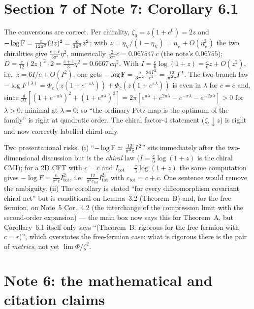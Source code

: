 \documentclass[11pt]{article}
\begin{document}
\section{Section 7 of Note 7: Corollary 6.1}\label{sec:cor}
\begin{verdictok}
The conversions are correct.  Per chirality, $\zeta_0=z(1+e^0)=2z$ and $-\log\operatorname{F}=\frac c{12\pi^2}(2z)^2=\frac c{3\pi^2}z^2$;
with $z=\eta_{\mathrm V}/(1-\eta_{\mathrm V})=\eta_{\mathrm V}+O(\eta_{\mathrm V}^2)$ the two chiralities give
$\frac{c+\bar c}{3\pi^2}\eta^2$, numerically $\frac2{3\pi^2}c=0.067547\,c$ (the note's $0.06755$);
$D=\frac c{12}(2z)^2\cdot2=\frac{c+\bar c}3\eta^2=0.6667\,c\eta^2$.  With $I=\frac c6\log(1+z)=\frac c6z+O(z^2)$,
i.e.\ $z=6I/c+O(I^2)$, one gets $-\log\operatorname{F}=\frac c{3\pi^2}\frac{36I^2}{c^2}=\frac{12}{\pi^2c}I^2$.  The
two-branch law $-\log F^{(\lambda)}=\Phi_c(z(1+e^{-\pi\lambda}))+\Phi_{\bar c}(z(1+e^{\pi\lambda}))$ is even in
$\lambda$ for $c=\bar c$ and, since $\frac d{d\lambda}[(1+e^{-\pi\lambda})^2+(1+e^{\pi\lambda})^2]
=2\pi[e^{\pi\lambda}+e^{2\pi\lambda}-e^{-\pi\lambda}-e^{-2\pi\lambda}]>0$ for $\lambda>0$, minimal at $\lambda=0$;
so ``the ordinary Petz map is the optimum of the family'' is right at quadratic order.  The chiral factor-$4$
statement ($\zeta_t\downarrow z$) is right and now correctly labelled chiral-only.
\end{verdictok}
\begin{verdictgap}
Two presentational risks.  (i) ``$-\log\operatorname{F}\simeq\frac{12}{\pi^2c}I^2$'' sits immediately after the
two-dimensional discussion but is the \emph{chiral} law ($I=\frac c6\log(1+z)$ is the chiral CMI); for a 2D CFT
with $c=\bar c$ and $I_{\mathrm{tot}}=\frac c3\log(1+z)$ the same computation gives
$-\log F=\frac6{\pi^2c}I_{\mathrm{tot}}^2$, i.e.\ $\frac{12}{\pi^2c_{\mathrm{tot}}}I_{\mathrm{tot}}^2$ with
$c_{\mathrm{tot}}=c+\bar c$.  One sentence would remove the ambiguity.  (ii) The corollary is stated ``for every
diffeomorphism covariant chiral net'' but is conditional on Lemma~3.2 (Theorem~B) and, for the free fermion, on
Note~5 Cor.~4.2 (the interchange of the compression limit with the second-order expansion) --- the main box now
says this for Theorem~A, but Corollary~6.1 itself only says ``(Theorem~B; rigorous for the free fermion with
$c=r$)'', which overstates the free-fermion case: what is rigorous there is the pair of \emph{metrics}, not yet
$\lim\Phi/\zeta^2$.
\end{verdictgap}

\section{Note 6: the mathematical and citation claims}\label{sec:n6}
\end{document}
